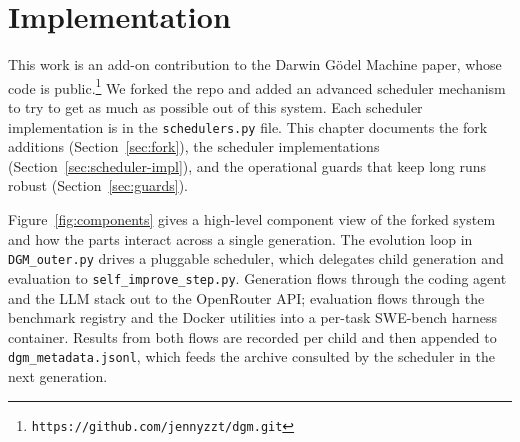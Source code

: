 \chapter{Implementation}
\label{chap:implementation}

This work is an add-on contribution to the Darwin G\"odel Machine paper,
whose code is public.\footnote{\texttt{https://github.com/jennyzzt/dgm.git}}
We forked the repo and added an advanced scheduler mechanism to try to
get as much as possible out of this system. Each scheduler implementation
is in the \texttt{schedulers.py} file. This chapter documents the fork
additions (Section~\ref{sec:fork}), the scheduler implementations
(Section~\ref{sec:scheduler-impl}), and the operational guards that keep
long runs robust (Section~\ref{sec:guards}).

Figure~\ref{fig:components} gives a high-level component view of the
forked system and how the parts interact across a single generation.
The evolution loop in \texttt{DGM\_outer.py} drives a pluggable
scheduler, which delegates child generation and evaluation to
\texttt{self\_improve\_step.py}. Generation flows through the coding
agent and the LLM stack out to the OpenRouter API; evaluation flows
through the benchmark registry and the Docker utilities into a
per-task SWE-bench harness container. Results from both flows are
recorded per child and then appended to \texttt{dgm\_metadata.jsonl},
which feeds the archive consulted by the scheduler in the next
generation.


